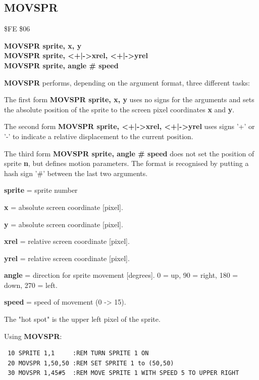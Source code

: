 \subsection{MOVSPR}
\begin{description}[leftmargin=2cm,style=nextline]
\item [Token:] \$FE \$06
\item [Format:] {\bf MOVSPR sprite, x, y} \\
                {\bf MOVSPR sprite, <+|->xrel, <+|->yrel} \\
                {\bf MOVSPR sprite, angle \# speed}
\item [Usage:]  {\bf MOVSPR} performs, depending on the argument
                format, three different tasks:

                The first form {\bf MOVSPR sprite, x, y} uses no
                signs for the arguments and sets the absolute
                position of the sprite to the screen pixel
                coordinates {\bf x} and {\bf y}.

                The second form {\bf MOVSPR sprite, <+|->xrel, <+|->yrel}
                uses signs '+' or '-' to indicate a relative
                displacement to the current position.

                The third form {\bf MOVSPR sprite, angle \# speed} does not
                set the position of sprite {\bf n}, but defines
                motion parameters. The format is recognised by putting
                a hash sign '\#' between the last two arguments.

                {\bf sprite} = sprite number

                {\bf x} = absolute screen coordinate [pixel].

                {\bf y} = absolute screen coordinate [pixel].

                {\bf xrel} = relative screen coordinate [pixel].

                {\bf yrel} = relative screen coordinate [pixel].

                {\bf angle} = direction for sprite movement [degrees].
                0 = up, 90 = right, 180 = down, 270 = left.

                {\bf speed} = speed of movement (0 -> 15).

\item [Remarks:] The "hot spot" is the upper left pixel of the sprite.

\item [Example:] Using {\bf MOVSPR}:
\begin{tcolorbox}[colback=black,coltext=white]
\verbatimfont{\codefont}
\begin{verbatim}
 10 SPRITE 1,1     :REM TURN SPRITE 1 ON
 20 MOVSPR 1,50,50 :REM SET SPRITE 1 to (50,50)
 30 MOVSPR 1,45#5  :REM MOVE SPRITE 1 WITH SPEED 5 TO UPPER RIGHT
\end{verbatim}
\end{tcolorbox}
\end{description}


